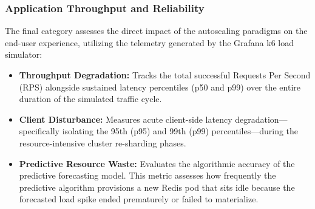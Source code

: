 \subsubsection{Application Throughput and Reliability}
The final category assesses the direct impact of the autoscaling paradigms on the end-user experience, utilizing the telemetry generated by the Grafana k6 load simulator:
\begin{itemize}
    \item \textbf{Throughput Degradation:} Tracks the total successful Requests Per Second (RPS) alongside sustained latency percentiles (p50 and p99) over the entire duration of the simulated traffic cycle.
    \item \textbf{Client Disturbance:} Measures acute client-side latency degradation---specifically isolating the 95th (p95) and 99th (p99) percentiles---during the resource-intensive cluster re-sharding phases.
    \item \textbf{Predictive Resource Waste:} Evaluates the algorithmic accuracy of the predictive forecasting model. This metric assesses how frequently the predictive algorithm provisions a new Redis pod that sits idle because the forecasted load spike ended prematurely or failed to materialize.
\end{itemize}